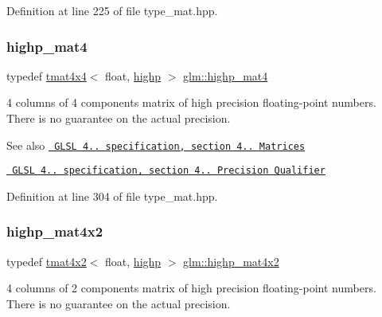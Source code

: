 Definition at line 225 of file type\+\_\+mat.\+hpp.

\mbox{\label{group__core__precision_ga26f802a535816c7357df06361e695172}} 
\subsubsection{\texorpdfstring{highp\_mat4}{highp\_mat4}}
{\footnotesize\ttfamily typedef \mbox{\hyperlink{structglm_1_1tmat4x4}{tmat4x4}}$<$ float, \mbox{\hyperlink{namespaceglm_a0f04f086094c747d227af4425893f545ac6f7eab42eacbb10d59a58e95e362074}{highp}} $>$ \mbox{\hyperlink{group__core__precision_ga26f802a535816c7357df06361e695172}{glm\+::highp\+\_\+mat4}}}

4 columns of 4 components matrix of high precision floating-\/point numbers. There is no guarantee on the actual precision.

\begin{DoxySeeAlso}{See also}
\href{http://www.opengl.org/registry/doc/GLSLangSpec.4.20.8.pdf}{\texttt{ G\+L\+SL 4.. specification, section 4.. Matrices}} 

\href{http://www.opengl.org/registry/doc/GLSLangSpec.4.20.8.pdf}{\texttt{ G\+L\+SL 4.. specification, section 4.. Precision Qualifier}} 
\end{DoxySeeAlso}


Definition at line 304 of file type\+\_\+mat.\+hpp.

\mbox{\label{group__core__precision_ga289d5d6b112dc6e3f545e7f98d3d0b5c}} 
\subsubsection{\texorpdfstring{highp\_mat4x2}{highp\_mat4x2}}
{\footnotesize\ttfamily typedef \mbox{\hyperlink{structglm_1_1tmat4x2}{tmat4x2}}$<$ float, \mbox{\hyperlink{namespaceglm_a0f04f086094c747d227af4425893f545ac6f7eab42eacbb10d59a58e95e362074}{highp}} $>$ \mbox{\hyperlink{group__core__precision_ga289d5d6b112dc6e3f545e7f98d3d0b5c}{glm\+::highp\+\_\+mat4x2}}}

4 columns of 2 components matrix of high precision floating-\/point numbers. There is no guarantee on the actual precision.

